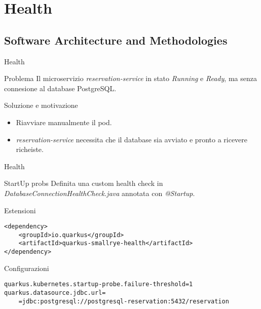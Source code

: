 \section{Health}

\subsection{Software Architecture and Methodologies}

\begin{frame}{Health}
    \begin{block}{Problema}
        Il microservizio \textit{reservation-service} in stato \textit{Running} e \textit{Ready}, ma senza connesione al database PostgreSQL.
    \end{block}
        \begin{block}{Soluzione e motivazione}
            \begin{itemize}
                \item Riavviare manualmente il pod.
                \item \textit{reservation-service} necessita che il database sia avviato e pronto a ricevere richeiste.
            \end{itemize}
    \end{block}
\end{frame}

\begin{frame}[fragile]{Health}
    \begin{block}{StartUp probs}
        Definita una custom health check in \textit{DatabaseConnectionHealthCheck.java} annotata con \textit{@Startup}.
    \end{block}
    \begin{block}{Estensioni}
        \begin{verbatim}
<dependency>
    <groupId>io.quarkus</groupId>
    <artifactId>quarkus-smallrye-health</artifactId>
</dependency>
        \end{verbatim}
    \end{block}
    \begin{block}{Configurazioni}
        \begin{verbatim}
quarkus.kubernetes.startup-probe.failure-threshold=1
quarkus.datasource.jdbc.url=
    =jdbc:postgresql://postgresql-reservation:5432/reservation
        \end{verbatim}
    \end{block}
\end{frame}